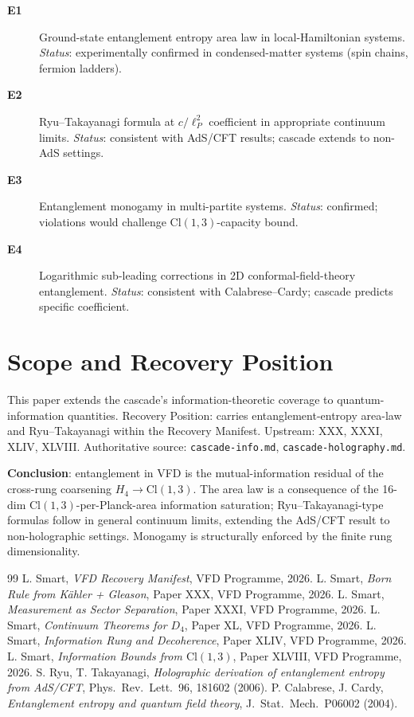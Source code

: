 \documentclass[12pt]{article}
\theoremstyle{remark}
\begin{document}
\begin{description}
\item[\textbf{E1}] Ground-state entanglement entropy area law in local-Hamiltonian systems. \emph{Status}: experimentally confirmed in condensed-matter systems (spin chains, fermion ladders).
\item[\textbf{E2}] Ryu--Takayanagi formula at $c / \ell_P^2$ coefficient in appropriate continuum limits. \emph{Status}: consistent with AdS/CFT results; cascade extends to non-AdS settings.
\item[\textbf{E3}] Entanglement monogamy in multi-partite systems. \emph{Status}: confirmed; violations would challenge $\mathrm{Cl}(1,3)$-capacity bound.
\item[\textbf{E4}] Logarithmic sub-leading corrections in 2D conformal-field-theory entanglement. \emph{Status}: consistent with Calabrese--Cardy; cascade predicts specific coefficient.
\end{description}

\section{Scope and Recovery Position}\label{sec:scope}

This paper extends the cascade's information-theoretic coverage to quantum-information quantities. Recovery Position: carries entanglement-entropy area-law and Ryu--Takayanagi within the Recovery Manifest. Upstream: XXX, XXXI, XLIV, XLVIII. Authoritative source: \texttt{cascade-info.md}, \texttt{cascade-holography.md}.

\textbf{Conclusion}: entanglement in VFD is the mutual-information residual of the cross-rung coarsening $H_4 \to \mathrm{Cl}(1,3)$. The area law is a consequence of the 16-dim $\mathrm{Cl}(1,3)$-per-Planck-area information saturation; Ryu--Takayanagi-type formulas follow in general continuum limits, extending the AdS/CFT result to non-holographic settings. Monogamy is structurally enforced by the finite rung dimensionality.


\begin{thebibliography}{99}
 L. Smart, \emph{VFD Recovery Manifest}, VFD Programme, 2026.
 L. Smart, \emph{Born Rule from K\"ahler + Gleason}, Paper XXX, VFD Programme, 2026.
 L. Smart, \emph{Measurement as Sector Separation}, Paper XXXI, VFD Programme, 2026.
 L. Smart, \emph{Continuum Theorems for $D_4$}, Paper XL, VFD Programme, 2026.
 L. Smart, \emph{Information Rung and Decoherence}, Paper XLIV, VFD Programme, 2026.
 L. Smart, \emph{Information Bounds from $\mathrm{Cl}(1,3)$}, Paper XLVIII, VFD Programme, 2026.
 S. Ryu, T. Takayanagi, \emph{Holographic derivation of entanglement entropy from AdS/CFT}, Phys.\ Rev.\ Lett.\ 96, 181602 (2006).
 P. Calabrese, J. Cardy, \emph{Entanglement entropy and quantum field theory}, J.\ Stat.\ Mech.\ P06002 (2004).
\end{thebibliography}
\end{document}
